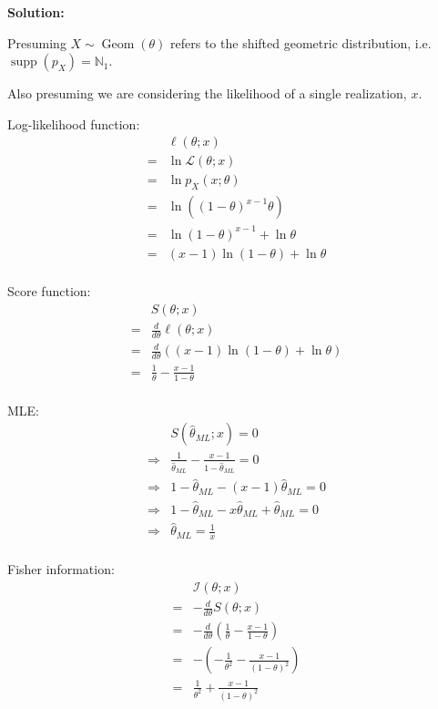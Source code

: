 \documentclass{article}
\begin{document}
\textbf{Solution:}
\begin{ssolution}
Presuming \(X \sim \operatorname{Geom}(\theta)\) refers to the shifted geometric
distribution, i.e. \(\operatorname{supp}(p_X) = \mathbb{N}_1\).

Also presuming we are considering the likelihood of a single realization, \(x\).

Log-likelihood function:
\begin{align*}
	& \ell(\theta;x) \\
	=& \ln \mathcal{L}(\theta;x) \\
	=& \ln p_X(x;\theta) \\
	=& \ln \left((1-\theta)^{x-1}\theta\right) \\
	=& \ln (1-\theta)^{x-1} + \ln \theta \\
	=& (x-1)\ln (1-\theta) + \ln \theta \\
\end{align*}

Score function:
\begin{align*}
	 & S(\theta;x) \\
	=& \frac{d}{d\theta} \ell(\theta;x) \\
	=& \frac{d}{d\theta} \left((x-1)\ln (1-\theta) + \ln \theta\right) \\
	=& \frac{1}{\theta}-\frac{x-1}{1-\theta} \\
\end{align*}

MLE:
\begin{align*}
	& S(\hat{\theta}_{ML};x) = 0 \\
	\Rightarrow& \frac{1}{\hat{\theta}_{ML}}-\frac{x-1}{1-\hat{\theta}_{ML}} = 0 \\
	\Rightarrow& 1-\hat{\theta}_{ML}-(x-1)\hat{\theta}_{ML} = 0 \\
	\Rightarrow& 1-\hat{\theta}_{ML}-x\hat{\theta}_{ML}+\hat{\theta}_{ML} = 0 \\
	\Rightarrow& \hat{\theta}_{ML} = \frac{1}{x} \\
\end{align*}

Fisher information:
\begin{align*}
	& \mathcal{I}(\theta;x) \\
	=& -\frac{d}{d\theta}S(\theta;x) \\
	=& -\frac{d}{d\theta}\left(\frac{1}{\theta}-\frac{x-1}{1-\theta}\right) \\
	=& -\left(-\frac{1}{\theta^2}-\frac{x-1}{(1-\theta)^2}\right) \\
	=& \frac{1}{\theta^2}+\frac{x-1}{(1-\theta)^2} \\
\end{align*}


\end{ssolution}
\end{document}
